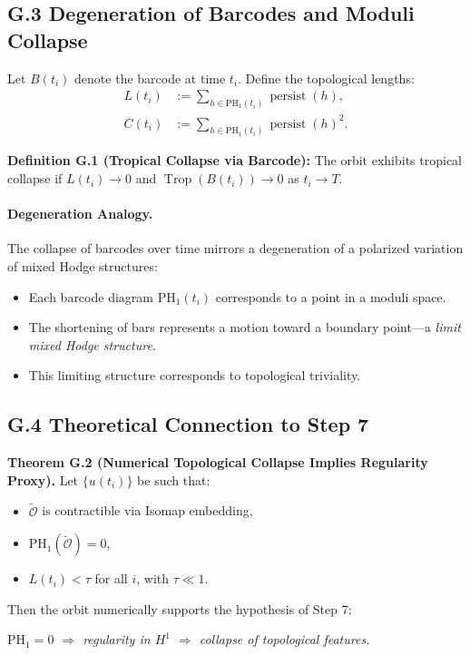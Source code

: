 \documentclass[11pt]{article}
\theoremstyle{definition}
\begin{document}
\subsection*{G.3 Degeneration of Barcodes and Moduli Collapse}
Let $B(t_i)$ denote the barcode at time $t_i$. Define the topological lengths:
\begin{align*}
L(t_i) &:= \sum_{h \in \mathrm{PH}_1(t_i)} \operatorname{persist}(h), \\
C(t_i) &:= \sum_{h \in \mathrm{PH}_1(t_i)} \operatorname{persist}(h)^2.
\end{align*}

\textbf{Definition G.1 (Tropical Collapse via Barcode):} The orbit exhibits tropical collapse if $L(t_i) \to 0$ and $\operatorname{Trop}(B(t_i)) \to 0$ as $t_i \to T$.

\paragraph{Degeneration Analogy.} The collapse of barcodes over time mirrors a degeneration of a polarized variation of mixed Hodge structures:
\begin{itemize}
    \item Each barcode diagram $\mathrm{PH}_1(t_i)$ corresponds to a point in a moduli space.
    \item The shortening of bars represents a motion toward a boundary point---a \emph{limit mixed Hodge structure}.
    \item This limiting structure corresponds to topological triviality.
\end{itemize}

\subsection*{G.4 Theoretical Connection to Step 7}
\textbf{Theorem G.2 (Numerical Topological Collapse Implies Regularity Proxy).} Let $\{u(t_i)\}$ be such that:
\begin{itemize}
    \item $\tilde{\mathcal{O}}$ is contractible via Isomap embedding,
    \item $\mathrm{PH}_1(\tilde{\mathcal{O}}) = 0$,
    \item $L(t_i) < \tau$ for all $i$, with $\tau \ll 1$.
\end{itemize}
Then the orbit numerically supports the hypothesis of Step 7:
\begin{center}
\textit{$\mathrm{PH}_1 = 0$ $\Rightarrow$ regularity in $H^1$ $\Rightarrow$ collapse of topological features.}
\end{center}
\end{document}

